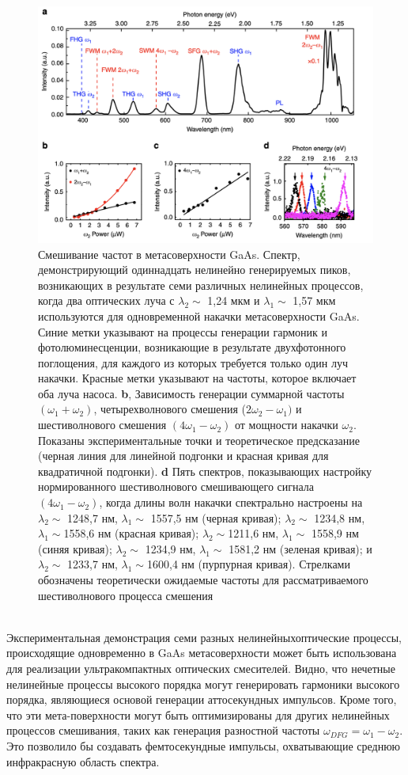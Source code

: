 \begin{figure}[h!]
	\centering
	\includegraphics[width=0.8\linewidth]{images/mixer1.png}
	\caption{Смешивание частот в метасоверхности GaAs. Спектр, демонстрирующий одиннадцать нелинейно генерируемых пиков, возникающих в результате семи различных нелинейных процессов, когда два оптических луча с  $\lambda_2 \sim$ 1,24 мкм и  $\lambda_1 \sim$ 1,57 мкм используются для одновременной накачки метасоверхности GaAs. Синие метки указывают на процессы генерации гармоник и фотолюминесценции, возникающие в результате двухфотонного поглощения, для каждого из которых требуется только один луч накачки. Красные метки указывают на частоты, которое включает оба луча насоса. \textbf{b}, Зависимость генерации суммарной частоты $(\omega_1 + \omega_2)$, четырехволнового смешения ($2\omega_2 - \omega_1)$ и шестиволнового смешения $(4\omega_1 - \omega_2)$ от мощности накачки $\omega_2$. Показаны экспериментальные  точки и теоретическое предсказание (черная линия для линейной подгонки и красная кривая для квадратичной подгонки). \textbf{d} Пять спектров, показывающих настройку нормированного шестиволнового смешивающего сигнала $(4\omega_1 - \omega_2)$, когда длины волн накачки спектрально настроены на $\lambda_2 \sim$ 1248,7 нм,  $\lambda_1 \sim$ 1557,5 нм (черная кривая); $\lambda_2 \sim$ 1234,8 нм, $\lambda_1 \sim$1558,6 нм (красная кривая); $\lambda_2 \sim$1211,6 нм, $\lambda_1 \sim$ 1558,9 нм (синяя кривая); $\lambda_2 \sim$ 1234,9 нм, $\lambda_1 \sim$ 1581,2 нм (зеленая кривая); и $\lambda_2 \sim$ 1233,7 нм, $\lambda_1 \sim$1600,4 нм (пурпурная кривая). Стрелками обозначены теоретически ожидаемые частоты для рассматриваемого шестиволнового процесса смешения}
	\label{mixerPictr2}
\end{figure}
\\
Экспериментальная демонстрация семи разных нелинейныхоптические процессы, происходящие одновременно в GaAs метасоверхности может быть использована для реализации ультракомпактных оптических смесителей. Видно, что нечетные нелинейные процессы высокого порядка могут генерировать гармоники высокого порядка, являющиеся основой генерации аттосекундных импульсов. Кроме того, что эти мета-поверхности могут быть оптимизированы для других нелинейных процессов смешивания, таких как генерация разностной частоты $\omega_{DFG} = \omega_1 - \omega_2$. Это позволило бы создавать фемтосекундные импульсы, охватывающие среднюю инфракрасную область спектра. 
